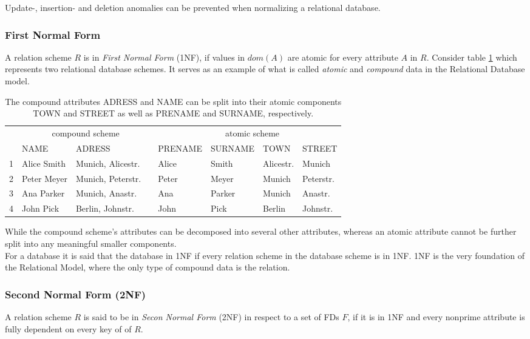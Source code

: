 Update-, insertion- and deletion anomalies can be prevented when normalizing a relational database. \cite[p.~75]{KLE11}

\subsubsection{First Normal Form}
A relation scheme $R$ is in \emph{First Normal Form} (1NF), if values in \(dom(A)\) are atomic for every attribute \(A\) in \(R\). \cite[p.~96]{MAI83}
Consider table \ref{tab:first-normal-form} which represents two relational database schemes.
It serves as an example of what is called \emph{atomic} and \emph{compound} data in the Relational Database model. \cite[p.~6]{COD90}

\begin{table}[ht]
    \centering
    \begin{tabular}{@{}rlllllll@{}}\toprule
    & \multicolumn{3}{c}{compound scheme} & \phantom{abc}& \multicolumn{2}{c}{atomic scheme} \\
    \cmidrule{2-3} \cmidrule{5-8}
    & NAME & ADRESS && PRENAME & SURNAME & TOWN & STREET   \\ \midrule
    1 & Alice Smith & Munich, Alicestr. && Alice & Smith & Alicestr. & Munich \\
2 &  Peter Meyer & Munich, Peterstr. && Peter & Meyer & Munich & Peterstr. \\
3 & Ana Parker & Munich, Anastr. && Ana & Parker & Munich & Anastr. \\
4 & John Pick & Berlin, Johnstr. && John & Pick & Berlin & Johnstr. \\
\bottomrule
\end{tabular}
\caption{The compound attributes ADRESS and NAME can be split into their atomic components TOWN and STREET as well as PRENAME and SURNAME, respectively.}
\label{tab:first-normal-form}
\end{table}
While the compound scheme's attributes can be decomposed into several other attributes, whereas an atomic attribute cannot be further split into any meaningful smaller components.\\

For a database it is said that the database in 1NF if every relation scheme in the database scheme is in 1NF.
1NF is the very foundation of the Relational Model, where the only type of compound data is the relation.\cite[p.~6]{COD90}

\subsubsection{Second Normal Form (2NF)}
A relation scheme \(R\) is said to be in \emph{Secon Normal Form} (2NF) in respect to a set of FDs \(F\), if it is in 1NF and every nonprime attribute is fully dependent on every key of of \(R\).\cite[p.~99]{MAI83}

